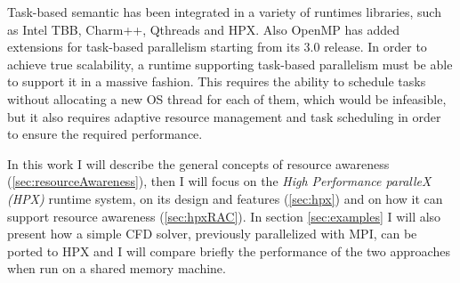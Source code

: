 
Task-based semantic has been integrated in a variety of runtimes libraries, such as Intel TBB\cite{contreras2008characterizing}, Charm++\cite{charmpp}, Qthreads\cite{qthreads} and HPX\cite{heller2017hpx}. Also OpenMP has added extensions for task-based parallelism starting from its 3.0 release\cite{omp30}.
In order to achieve true scalability, a runtime supporting task-based parallelism must be able to support it in a massive fashion. This requires the ability to schedule tasks without allocating a new OS thread for each of them, which would be infeasible, but it also requires adaptive resource management and task scheduling in order to ensure the required performance.

In this work I will describe the general concepts of resource awareness (\ref{sec:resourceAwareness}), then I will focus on the \emph{High Performance paralleX (HPX)} runtime system, on its design and features (\ref{sec:hpx}) and on how it can support resource awareness (\ref{sec:hpxRAC}).
In section \ref{sec:examples} I will also present how a simple CFD solver, previously parallelized with MPI, can be ported to HPX and I will compare briefly the performance of the two approaches when run on a shared memory machine.

